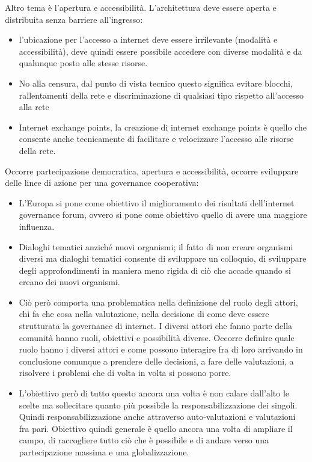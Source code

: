 \par
Altro tema è l'apertura e accessibilità.
L'architettura deve essere aperta e distribuita senza barriere all'ingresso:
\begin{itemize}
    \item l'ubicazione per l'accesso a internet deve essere irrilevante (modalità e accessibilità), deve quindi essere possibile accedere con diverse modalità e da qualunque posto alle stesse risorse.
    \item No alla censura, dal punto di vista tecnico questo significa evitare blocchi, rallentamenti della rete e discriminazione di qualsiasi tipo rispetto all'accesso alla rete
    \item Internet exchange points, la creazione di internet exchange points è quello che consente anche tecnicamente di facilitare e velocizzare l'accesso alle risorse della rete. \end{itemize}
\par
Occorre partecipazione democratica, apertura e accessibilità,  occorre sviluppare delle linee di azione per una governance cooperativa:
\begin{itemize}
    \item  L'Europa si pone come obiettivo il miglioramento dei risultati dell'internet governance forum, ovvero si pone come obiettivo quello di avere una maggiore influenza.
    \item Dialoghi tematici anziché nuovi organismi; il fatto di non creare organismi diversi ma dialoghi tematici consente di sviluppare un colloquio, di sviluppare degli approfondimenti in maniera meno rigida di ciò che accade quando si creano dei nuovi organismi.
    \item Ciò però comporta una problematica nella definizione del ruolo degli attori, chi fa che cosa nella valutazione, nella decisione di come deve essere strutturata la governance di internet. I diversi attori che fanno parte della comunità hanno ruoli, obiettivi e possibilità diverse. Occorre definire quale ruolo hanno i diversi attori e come possono interagire fra di loro arrivando in conclusione comunque a prendere delle decisioni, a fare delle valutazioni, a risolvere i problemi che di volta in volta si possono porre.
    \item L'obiettivo però di tutto questo ancora una volta è non calare dall'alto le scelte ma sollecitare quanto più possibile la responsabilizzazione dei singoli. Quindi responsabilizzazione anche attraverso auto-valutazioni e valutazioni fra pari. Obiettivo quindi generale è quello ancora una volta di ampliare il campo, di raccogliere tutto ciò che è possibile e di andare verso una partecipazione massima e una globalizzazione.
\end{itemize}
\par %
